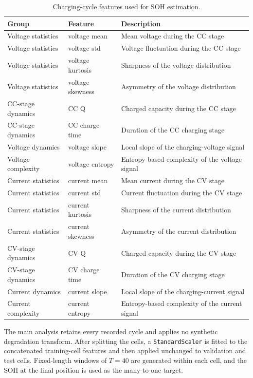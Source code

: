\documentclass[pdflatex,sn-mathphys-num]{sn-jnl}
\begin{document}
\begin{table}[t]
\caption{Charging-cycle features used for SOH estimation.}
\label{tab:features}
\centering
\begin{tabular*}{\textwidth}{@{\extracolsep{\fill}}lll@{}}
\toprule
Group & Feature & Description \\
\midrule
Voltage statistics & voltage mean & Mean voltage during the CC stage \\
Voltage statistics & voltage std & Voltage fluctuation during the CC stage \\
Voltage statistics & voltage kurtosis & Sharpness of the voltage distribution \\
Voltage statistics & voltage skewness & Asymmetry of the voltage distribution \\
CC-stage dynamics & CC Q & Charged capacity during the CC stage \\
CC-stage dynamics & CC charge time & Duration of the CC charging stage \\
Voltage dynamics & voltage slope & Local slope of the charging-voltage signal \\
Voltage complexity & voltage entropy & Entropy-based complexity of the voltage signal \\
Current statistics & current mean & Mean current during the CV stage \\
Current statistics & current std & Current fluctuation during the CV stage \\
Current statistics & current kurtosis & Sharpness of the current distribution \\
Current statistics & current skewness & Asymmetry of the current distribution \\
CV-stage dynamics & CV Q & Charged capacity during the CV stage \\
CV-stage dynamics & CV charge time & Duration of the CV charging stage \\
Current dynamics & current slope & Local slope of the charging-current signal \\
Current complexity & current entropy & Entropy-based complexity of the current signal \\
\bottomrule
\end{tabular*}
\end{table}

The main analysis retains every recorded cycle and applies no synthetic degradation transform. After splitting the cells, a \texttt{StandardScaler} is fitted to the concatenated training-cell features and then applied unchanged to validation and test cells. Fixed-length windows of $T=40$ are generated within each cell, and the SOH at the final position is used as the many-to-one target.
\end{document}
